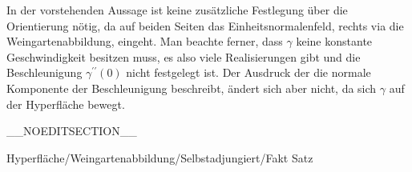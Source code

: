 In der vorstehenden Aussage ist keine zusätzliche Festlegung über die Orientierung nötig, da auf beiden Seiten das Einheitsnormalenfeld, rechts via die Weingartenabbildung, eingeht. Man beachte ferner, dass $\gamma$ keine konstante Geschwindigkeit besitzen muss, es also viele Realisierungen gibt und die Beschleunigung $\gamma^{\prime \prime} (0)$ nicht festgelegt ist. Der Ausdruck
 der die normale Komponente der Beschleunigung beschreibt, ändert sich aber nicht, da sich $\gamma$ auf der Hyperfläche bewegt.

__NOEDITSECTION__

{Hyperfläche/Weingartenabbildung/Selbstadjungiert/Fakt}
{Satz}
{}
{

\faktzusatz {}
\faktzusatz {}

}
